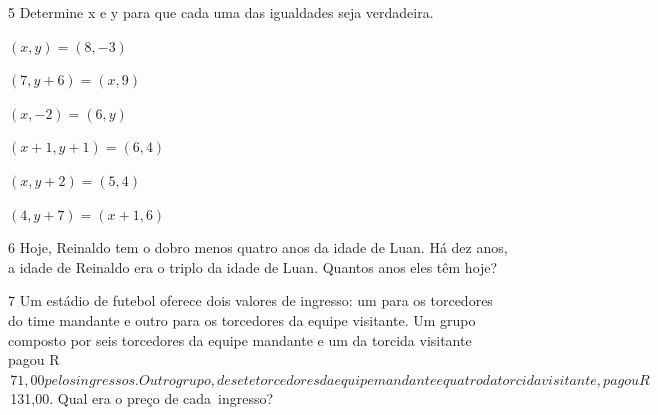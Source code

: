 
\num{5} Determine x e y para que cada uma das igualdades seja verdadeira.

\begin{escolha}
\item $(x, y ) = ( 8, -3)$
\item $(7, y + 6) = (x, 9)$
\item $(x, -2) = (6, y)$
\item $(x + 1, y + 1) = (6, 4)$
\item $(x, y + 2) = (5, 4)$
\item $(4, y + 7) = (x + 1, 6)$
\end{escolha}

\num{6} Hoje, Reinaldo tem o dobro menos quatro anos da idade de Luan. Há dez
anos, a idade de Reinaldo era o triplo da idade de Luan. Quantos anos
eles têm hoje?









\num{7} Um estádio de futebol oferece dois valores de ingresso: um para os
torcedores do time mandante e outro para os torcedores da equipe visitante. Um
grupo composto por seis torcedores da equipe mandante e um da torcida
visitante pagou R$\,71,00 pelos ingressos. Outro grupo, de sete torcedores da
equipe mandante e quatro da torcida visitante, pagou R$\,131,00. Qual era o
preço de cada~ingresso?





